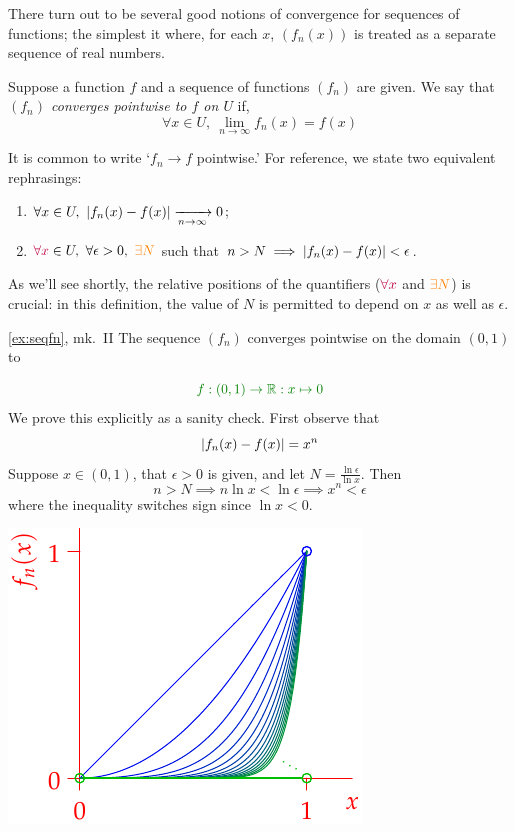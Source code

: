 There turn out to be several good notions of convergence for sequences of functions; the simplest it where, for each $x$, $(f_n(x))$ is treated as a separate sequence of real numbers.\goodbreak

\begin{defn}{}{}
Suppose a function $f$ and a sequence of functions $(f_n)$ are given. We say that \emph{$(f_n)$ converges pointwise to $f$ on $U$} if,
\[\forall x\in U,\ \lim\limits_{n\to\infty}f_n(x)=f(x)\]
\end{defn}

It is common to write `$f_n\to f$ pointwise.' For reference, we state two equivalent rephrasings:
\begin{enumerate}
  \item $\displaystyle \forall x\in U, \ \nm{f_n(x)-f(x)}\xrightarrow[n\to\infty]{}0$;
  \item $\textcolor{purple}{\forall x}\in U,\ \forall \epsilon>0,\ \textcolor{orange}{\exists N}$ such that $n>N\implies \left| f_n(x)-f(x)\right|<\epsilon$.
\end{enumerate}
As we'll see shortly, the relative positions of the quantifiers ($\textcolor{purple}{\forall x}$ and $\textcolor{orange}{\exists N}$) is crucial: in this definition, the value of $N$ is permitted to depend on $x$ as well as $\epsilon$.
\vspace*{10pt}


\begin{example*}{\ref{ex:seqfn}, mk.\ II}{}
The sequence $(f_n)$ converges pointwise on the domain $(0,1)$ to\smallbreak
\begin{minipage}[t]{0.6\linewidth}\vspace{-12pt}
\[\textcolor{Green}{f:(0,1)\to\R:x\mapsto 0}\]
We prove this explicitly as a sanity check. First observe that
\[\left| f_n(x)-f(x)\right|=x^n\]
Suppose $x\in(0,1)$, that $\epsilon>0$ is given, and let $N=\frac{\ln\epsilon}{\ln x}$. Then
\[n>N\implies n\ln x<\ln\epsilon\implies x^n<\epsilon\]
where the inequality switches sign since $\ln x<0$.
\end{minipage}\begin{minipage}[t]{0.4\linewidth}\vspace{0pt}
\flushright\includegraphics{seqex2}
\end{minipage}
\end{example*}

